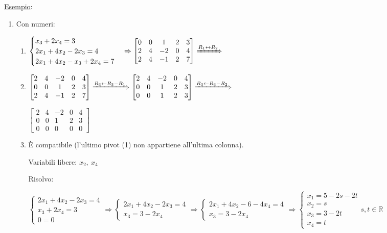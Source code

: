\documentclass{article}
\newcommand{\ul}[1]{\underline{#1}}
\newcommand{\R}{\mathbb{R}}
\begin{document}
\ul{Esempio}:
\begin{enumerate}
	\item Con numeri:
	  \begin{enumerate}
		  \item $\begin{cases}
				  x_3+2x_4=3       \\
				  2x_1+4x_2-2x_3=4 \\
				  2x_1+4x_2-x_3+2x_4=7
			  \end{cases}\Rightarrow
			  \begin{bmatrix}
				  0 & 0 & 1  & 2 & 3 \\
				  2 & 4 & -2 & 0 & 4 \\
				  2 & 4 & -1 & 2 & 7
			  \end{bmatrix}\xRightarrow{R_1\leftrightarrow R_2}$

		  \item $\begin{bmatrix}
				  2 & 4 & -2 & 0 & 4 \\
				  0 & 0 & 1  & 2 & 3 \\
				  2 & 4 & -1 & 2 & 7
			  \end{bmatrix}\xRightarrow{R_3\leftarrow R_3-R_1}
			  \begin{bmatrix}
				  2 & 4 & -2 & 0 & 4 \\
				  0 & 0 & 1  & 2 & 3 \\
				  0 & 0 & 1  & 2 & 3
			  \end{bmatrix}\xRightarrow{R_3\leftarrow R_3-R_2}$

		    $\begin{bmatrix}
				  2 & 4 & -2 & 0 & 4 \\
				  0 & 0 & 1  & 2 & 3 \\
				  0 & 0 & 0  & 0 & 0
			  \end{bmatrix}$
		  \item È compatibile (l'ultimo pivot (1) non appartiene all'ultima colonna).

		    Variabili libere: $x_2,\ x_4$

		    Risolvo:

		    $\begin{cases}
				  2x_1+4x_2-2x_3=4 \\
				  x_3+2x_4=3       \\
				  0=0
			  \end{cases}\Rightarrow
			  \begin{cases}
				  2x_1+4x_2-2x_3=4 \\
				  x_3=3-2x_4
			  \end{cases}\Rightarrow
			  \begin{cases}
				  2x_1+4x_2-6-4x_4=4 \\
				  x_3=3-2x_4
			  \end{cases}\Rightarrow
			  \begin{cases}
				  x_1=5-2s-2t \\
				  x_2=s       \\
				  x_3=3-2t    \\
				  x_4=t
			  \end{cases}s,t\in\R$


\end{enumerate}
\end{enumerate}
\end{document}

